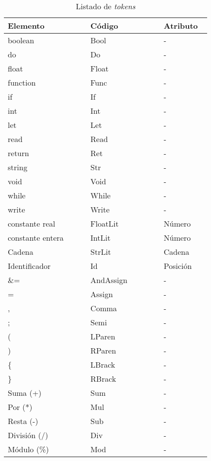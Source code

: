 \documentclass[a4paper]{CSMakotoTechnicalReport}
\begin{document}
\begin{multicols}{2}
    \renewcommand{\arraystretch}{1.19}
    \begin{table}[H]
        \caption{Listado de \textit{tokens}}
        \begin{tabular}{L{0.35\linewidth} L{0.31\linewidth} L{0.17\linewidth}}
            \toprule
            \textbf{Elemento} & \textbf{Código} & \textbf{Atributo} \\
            \midrule
            boolean & Bool & - \\
            do & Do & - \\
            float & Float & - \\
            function & Func & - \\
            if & If & - \\
            int & Int & - \\
            let & Let & - \\
            read & Read & - \\
            return & Ret & - \\
            string & Str & - \\
            void & Void & - \\
            while & While & - \\
            write & Write & - \\
            constante real & FloatLit & Número \\
            constante entera & IntLit & Número \\
            Cadena & StrLit & Cadena \\
            Identificador & Id & Posición \\
            \&= & AndAssign & - \\
            = & Assign & - \\
            , & Comma & - \\
            ; & Semi & - \\
            ( & LParen & - \\
            ) & RParen & - \\
            \{ & LBrack & - \\
            \} & RBrack & - \\
            Suma (+) & Sum & - \\
            Por (*) & Mul & - \\
            Resta (-) & Sub & - \\
            División (/) & Div & - \\
            Módulo (\%) & Mod & - \\

\end{tabular}
\end{table}
\end{multicols}
\end{document}
